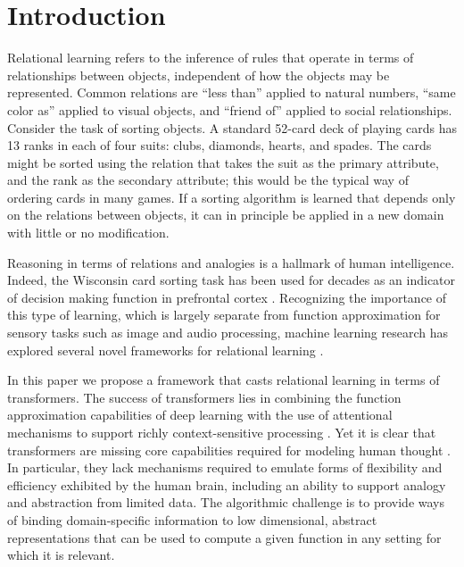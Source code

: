 \section{Introduction}
\label{sec:intro}

Relational learning refers to the inference of rules that operate in terms of
relationships between objects, independent of how the objects may be represented. Common relations are
``less than'' applied to natural numbers, ``same color as'' applied to visual objects, and ``friend of'' applied to
social relationships. Consider the task of sorting objects. A standard 52-card deck of playing cards has 13 ranks in
each of four suits: clubs, diamonds, hearts, and spades. The cards might be sorted using the relation that takes
the suit as the primary attribute, and the rank as the secondary attribute; this would be the typical 
way of ordering cards in many games. If a sorting algorithm is learned that depends 
only on the relations between objects, it can in principle be applied in a new domain with little 
or no modification. 

Reasoning in terms of relations and analogies is a hallmark of human intelligence. 
Indeed, the Wisconsin card sorting task \citep{berg} has been used for decades as an indicator of decision making
function in prefrontal cortex \citep{monchi}. Recognizing the importance of this type of learning, which is largely
separate from function approximation for sensory tasks such as image and audio processing, machine learning research
has explored several novel frameworks for relational learning \citep{TEM, NTM,episodicControl,esbn,mondal23learned,
battaglia,barrett:2018,santoro1} .

In this paper we propose a framework that casts relational learning in terms of transformers. 
The success of transformers lies in combining the function approximation capabilities of deep learning with the use
of attentional mechanisms to support richly context-sensitive processing \citep{transformers,vaswani2017attention,
    kerg2020untangling}. Yet it is clear that transformers are missing core capabilities required for modeling human
thought \citep{mahowald2023dissociating}.  In particular, they lack mechanisms required to emulate forms of
flexibility and efficiency exhibited by the human brain, including an ability to support analogy and abstraction
from limited data. The algorithmic challenge is to provide ways of binding domain-specific information to low
dimensional, abstract representations that can be used to compute a given function in any setting for which it is relevant.

